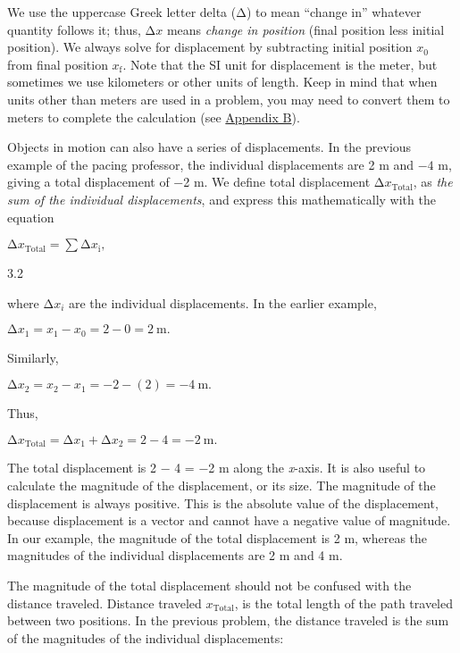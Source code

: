 We use the uppercase Greek letter delta (Δ) to mean ``change in''
whatever quantity follows it; thus, \(\mathrm{\Delta}x\) means
\emph{change in position} (final position less initial position). We
always solve for displacement by subtracting initial position \(x_{0}\)
from final position \(x_{\mathrm{f}}\). Note that the SI unit for
displacement is the meter, but sometimes we use kilometers or other
units of length. Keep in mind that when units other than meters are used
in a problem, you may need to convert them to meters to complete the
calculation (see
\href{http://openstax.org/books/university-physics-volume-1/pages/b-conversion-factors}{Appendix
B}).

Objects in motion can also have a series of displacements. In the
previous example of the pacing professor, the individual displacements
are 2 m and \(- 4\) m, giving a total displacement of −2 m. We define
total displacement \(\mathrm{\Delta}x_{\mathrm{\text{Total}}}\), as
\emph{the sum of the individual displacements}, and express this
mathematically with the equation

\(\mathrm{\Delta}x_{\mathrm{\text{Total}}} = \sum\mathrm{\Delta}x_{\mathrm{i}},\)

3.2

where \(\mathrm{\Delta}x_{i}\) are the individual displacements. In the
earlier example,

\(\mathrm{\Delta}x_{1} = x_{1} - x_{0} = 2 - 0 = 2\ \mathrm{\text{m.}}\)

Similarly,

\(\mathrm{\Delta}x_{2} = x_{2} - x_{1} = - 2 - (2) = - 4\ \mathrm{\text{m.}}\)

Thus,

\(\mathrm{\Delta}x_{\mathrm{\text{Total}}} = \mathrm{\Delta}x_{1} + \mathrm{\Delta}x_{2} = 2 - 4 = - 2\ \mathrm{m}\mathrm{.}\)

The total displacement is 2 − 4 = −2 m along the \emph{x}-axis. It is
also useful to calculate the magnitude of the displacement, or its size.
The magnitude of the displacement is always positive. This is the
absolute value of the displacement, because displacement is a vector and
cannot have a negative value of magnitude. In our example, the magnitude
of the total displacement is 2 m, whereas the magnitudes of the
individual displacements are 2 m and 4 m.

The magnitude of the total displacement should not be confused with the
distance traveled. Distance traveled \(x_{\mathrm{\text{Total}}}\), is
the total length of the path traveled between two positions. In the
previous problem, the distance traveled is the sum of the magnitudes of
the individual displacements:

